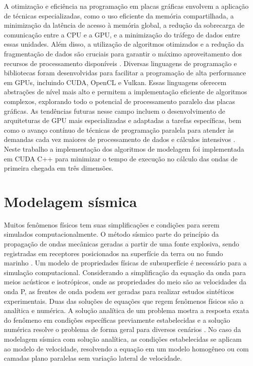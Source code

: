 A otimização e eficiência na programação em placas gráficas envolvem a aplicação de técnicas especializadas, como o uso eficiente da memória compartilhada, a minimização da latência de acesso à memória global, a redução da sobrecarga de comunicação entre a CPU e a GPU, e a minimização do tráfego de dados entre essas unidades. Além disso, a utilização de algoritmos otimizados e a redução da fragmentação de dados são cruciais para garantir o máximo aproveitamento dos recursos de processamento disponíveis \cite{luebke2008cuda}. Diversas linguagens de programação e bibliotecas foram desenvolvidas para facilitar a programação de alta performance em GPUs, incluindo CUDA, OpenCL e Vulkan. Essas linguagens oferecem abstrações de nível mais alto e permitem a implementação eficiente de algoritmos complexos, explorando todo o potencial de processamento paralelo das placas gráficas. As tendências futuras nesse campo incluem o desenvolvimento de arquiteturas de GPU mais especializadas e adaptadas a tarefas específicas, bem como o avanço contínuo de técnicas de programação paralela para atender às demandas cada vez maiores de processamento de dados e cálculos intensivos \cite{sterling2017high}. Neste trabalho a implementação dos algoritmos de modelagem foi implementada em CUDA C++ para minimizar o tempo de execução no cálculo das ondas de primeira chegada em três dimensões.

\section{Modelagem sísmica}

Muitos fenômenos físicos tem suas simplificações e condições para serem simulados computacionalmente. O método sísmico parte do princípio da propagação de ondas mecânicas geradas a partir de uma fonte explosiva, sendo registradas em receptores posicionados na superfície da terra ou no fundo marinho \cite{sheriff1995exploration, rosa2010analise}. Um modelo de propriedades físicas de subsuperfície é necessário para a simulação computacional. Considerando a simplificação da equação da onda para meios acústicos e isotrópicos, onde as propriedades do meio são as velocidades da onda P, as frentes de onda podem ser geradas para realizar estudos sintéticos experimentais. Duas das soluções de equações que regem fenômenos físicos são a analítica e numérica. A solução analítica de um problema mostra a resposta exata do fenômeno em condições específicas previamente estabelecidas e a solução numérica resolve o problema de forma geral para diversos cenários \cite{igel2017computational}. No caso da modelagem sísmica com solução analítica, as condições estabelecidas se aplicam ao modelo de velocidade, resolvendo a equação em um modelo homogêneo ou com camadas plano paralelas sem variação lateral de velocidade.  

